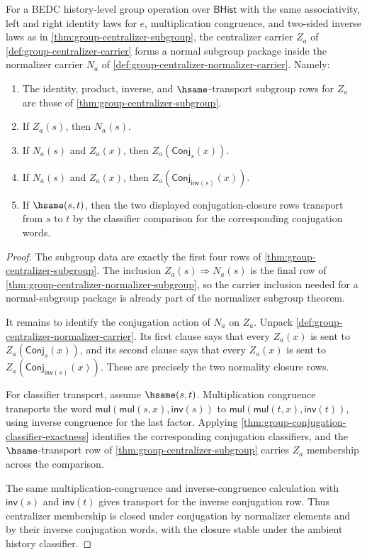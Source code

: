 \begin{theorem}
\label{thm:group-centralizer-normal-in-normalizer}
For a BEDC history-level group operation over $\mathsf{BHist}$ with the same
associativity, left and right identity laws for $e$, multiplication
congruence, and two-sided inverse laws as in
\autoref{thm:group-centralizer-subgroup}, the centralizer carrier $Z_a$ of
\autoref{def:group-centralizer-carrier} forms a normal subgroup package inside
the normalizer carrier $N_a$ of
\autoref{def:group-centralizer-normalizer-carrier}. Namely:
\begin{enumerate}
\item The identity, product, inverse, and $\hsame$-transport subgroup rows for
$Z_a$ are those of \autoref{thm:group-centralizer-subgroup}.
\item If $Z_a(s)$, then $N_a(s)$.
\item If $N_a(s)$ and $Z_a(x)$, then $Z_a(\mathsf{Conj}_s(x))$.
\item If $N_a(s)$ and $Z_a(x)$, then
$Z_a(\mathsf{Conj}_{\mathsf{inv}(s)}(x))$.
\item If $\hsame(s,t)$, then the two displayed conjugation-closure rows
transport from $s$ to $t$ by the classifier comparison for the corresponding
conjugation words.
\end{enumerate}
\end{theorem}
\begin{proof}
The subgroup data are exactly the first four rows of
\autoref{thm:group-centralizer-subgroup}. The inclusion $Z_a(s)\Rightarrow
N_a(s)$ is the final row of
\autoref{thm:group-centralizer-normalizer-subgroup}, so the carrier inclusion
needed for a normal-subgroup package is already part of the normalizer
subgroup theorem.

It remains to identify the conjugation action of $N_a$ on $Z_a$. Unpack
\autoref{def:group-centralizer-normalizer-carrier}. Its first clause says that
every $Z_a(x)$ is sent to $Z_a(\mathsf{Conj}_s(x))$, and its second clause says
that every $Z_a(x)$ is sent to
$Z_a(\mathsf{Conj}_{\mathsf{inv}(s)}(x))$. These are precisely the two
normality closure rows.

For classifier transport, assume $\hsame(s,t)$. Multiplication congruence
transports the word $\mathsf{mul}(\mathsf{mul}(s,x),\mathsf{inv}(s))$ to
$\mathsf{mul}(\mathsf{mul}(t,x),\mathsf{inv}(t))$, using inverse congruence for
the last factor. Applying
\autoref{thm:group-conjugation-classifier-exactness} identifies the
corresponding conjugation classifiers, and the $\hsame$-transport row of
\autoref{thm:group-centralizer-subgroup} carries $Z_a$ membership across the
comparison.

The same multiplication-congruence and inverse-congruence calculation with
$\mathsf{inv}(s)$ and $\mathsf{inv}(t)$ gives transport for the inverse
conjugation row. Thus centralizer membership is closed under conjugation by
normalizer elements and by their inverse conjugation words, with the closure
stable under the ambient history classifier.
\end{proof}

